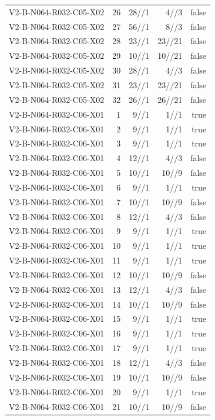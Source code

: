 {\begin{longtable}{lrrrr}
V2-B-N064-R032-C05-X02 & 26 & 28//1 & 4//3 & false \\
V2-B-N064-R032-C05-X02 & 27 & 56//1 & 8//3 & false \\
V2-B-N064-R032-C05-X02 & 28 & 23//1 & 23//21 & false \\
V2-B-N064-R032-C05-X02 & 29 & 10//1 & 10//21 & false \\
V2-B-N064-R032-C05-X02 & 30 & 28//1 & 4//3 & false \\
V2-B-N064-R032-C05-X02 & 31 & 23//1 & 23//21 & false \\
V2-B-N064-R032-C05-X02 & 32 & 26//1 & 26//21 & false \\
V2-B-N064-R032-C06-X01 & 1 & 9//1 & 1//1 & true \\
V2-B-N064-R032-C06-X01 & 2 & 9//1 & 1//1 & true \\
V2-B-N064-R032-C06-X01 & 3 & 9//1 & 1//1 & true \\
V2-B-N064-R032-C06-X01 & 4 & 12//1 & 4//3 & false \\
V2-B-N064-R032-C06-X01 & 5 & 10//1 & 10//9 & false \\
V2-B-N064-R032-C06-X01 & 6 & 9//1 & 1//1 & true \\
V2-B-N064-R032-C06-X01 & 7 & 10//1 & 10//9 & false \\
V2-B-N064-R032-C06-X01 & 8 & 12//1 & 4//3 & false \\
V2-B-N064-R032-C06-X01 & 9 & 9//1 & 1//1 & true \\
V2-B-N064-R032-C06-X01 & 10 & 9//1 & 1//1 & true \\
V2-B-N064-R032-C06-X01 & 11 & 9//1 & 1//1 & true \\
V2-B-N064-R032-C06-X01 & 12 & 10//1 & 10//9 & false \\
V2-B-N064-R032-C06-X01 & 13 & 12//1 & 4//3 & false \\
V2-B-N064-R032-C06-X01 & 14 & 10//1 & 10//9 & false \\
V2-B-N064-R032-C06-X01 & 15 & 9//1 & 1//1 & true \\
V2-B-N064-R032-C06-X01 & 16 & 9//1 & 1//1 & true \\
V2-B-N064-R032-C06-X01 & 17 & 9//1 & 1//1 & true \\
V2-B-N064-R032-C06-X01 & 18 & 12//1 & 4//3 & false \\
V2-B-N064-R032-C06-X01 & 19 & 10//1 & 10//9 & false \\
V2-B-N064-R032-C06-X01 & 20 & 9//1 & 1//1 & true \\
V2-B-N064-R032-C06-X01 & 21 & 10//1 & 10//9 & false \\

\end{longtable}}
